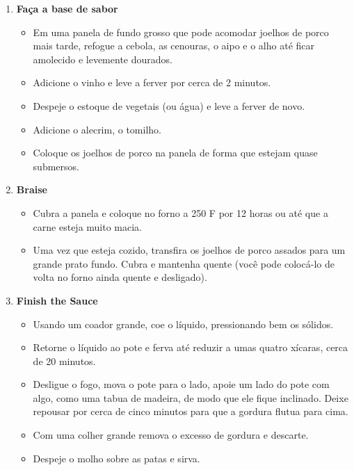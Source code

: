 \documentclass [11pt, letterpaper] {article}
\begin{document}
\begin {description}
\begin {enumerate}
\item {\bf Faça a base de sabor}
\begin {itemize}
\item Em uma panela de fundo grosso que pode acomodar joelhos de porco mais tarde, refogue a cebola, as cenouras, o aipo e o alho até ficar amolecido e levemente dourados.
\item Adicione o vinho e leve a ferver por cerca de 2 minutos.
\item Despeje o estoque de vegetais (ou água) e leve a ferver de novo.
\item Adicione o alecrim, o tomilho.
\item Coloque os joelhos de porco na panela de forma que estejam quase submersos.
\end {itemize}

\item {\bf Braise}
\begin{itemize}
\item Cubra a panela e coloque no forno a 250 F por 12 horas ou até que a carne esteja muito macia.
\item Uma vez que esteja cozido, transfira os joelhos de porco assados para um grande prato fundo. Cubra e mantenha quente (você pode colocá-lo de volta no forno ainda quente e desligado).
\end {itemize}

\item {\bf Finish the Sauce}
\begin {itemize}
\item Usando um coador grande, coe o líquido, pressionando bem os sólidos.
\item Retorne o líquido ao pote e ferva até reduzir a umas quatro x\'icaras, cerca de 20 minutos.
\item Desligue o fogo, mova o pote para o lado, apoie um lado do pote com algo, como uma tabua de madeira, de modo que ele fique inclinado. Deixe repousar por cerca de cinco minutos para que a gordura flutua para cima.
\item Com uma colher grande remova  o excesso de gordura e descarte.
\item Despeje o molho sobre as patas e sirva.
\end {itemize}

\end {enumerate}
\end {description}
\end{document}
